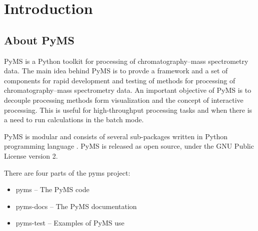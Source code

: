 

\chapter{Introduction}

\section{About PyMS}

PyMS is a Python toolkit for processing of chromatography--mass spectrometry
data. The main idea behind PyMS is to provde a framework and a set of
components for rapid development and testing of methods for processing of
chromatography--mass spectrometry data. An important objective of PyMS is
to decouple processing methods form visualization and the concept of
interactive processing. This is useful for high-throughput processing tasks
and when there is a need to run calculations in the batch mode.

PyMS is modular and consists of several sub-packages written in Python
programming language \cite{python}. PyMS is released as open source,
under the GNU Public License version 2.

There are four parts of the pyms project:

\begin{itemize}
  \item pyms -- The PyMS code
  \item pyms-docs -- The PyMS documentation
  \item pyms-test -- Examples of PyMS use
\end{itemize}

